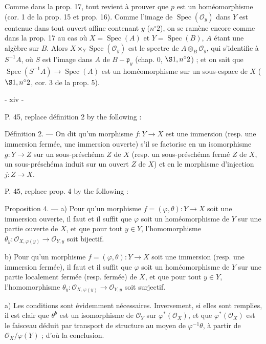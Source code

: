 Comme dans la prop. 17, tout revient à prouver que $p$ est un homéomorphisme (cor. 1 de la prop. 15 et prop. 16). Comme l'image de $\operatorname{Spec}(\mathcal{O}_y)$ dans $Y$ est contenue dans tout ouvert affine contenant $y$ ($n^\circ 2$), on se ramène encore comme dans la prop. 17 au cas où $X = \operatorname{Spec}(A)$ et $Y = \operatorname{Spec}(B)$, $A$ étant une algèbre sur $B$. Alors $X \times_Y \operatorname{Spec}(\mathcal{O}_y)$ est le spectre de $A \otimes_B \mathcal{O}_y$, qui s'identifie à $S^{-1}A$, où $S$ est l'image dans $A$ de $B - \mathfrak{p}_y$ (chap. 0, $\S 1, n^\circ 2$) ; et on sait que $\operatorname{Spec}(S^{-1}A) \to \operatorname{Spec}(A)$ est un homéomorphisme sur un sous-espace de $X$ ($\S 1, n^\circ 2$, cor. 3 de la prop. 5).

\newpage


- xiv -

P. 45, replace définition 2 by the following :

Définition 2. — On dit qu'un morphisme $f : Y \to X$ est une immersion (resp. une immersion fermée, une immersion ouverte) s'il se factorise en un isomorphisme $g : Y \to Z$ sur un sous-préschéma $Z$ de $X$ (resp. un sous-préschéma fermé $Z$ de $X$, un sous-préschéma induit sur un ouvert $Z$ de $X$) et en le morphisme d'injection $j : Z \to X$.

P. 45, replace prop. 4 by the following :

Proposition 4. — a) Pour qu'un morphisme $f = (\varphi, \theta) : Y \to X$ soit une immersion ouverte, il faut et il suffit que $\varphi$ soit un homéomorphisme de $Y$ sur une partie ouverte de $X$, et que pour tout $y \in Y$, l'homomorphisme $\theta_y : \mathcal{O}_{X, \varphi(y)} \to \mathcal{O}_{Y, y}$ soit bijectif.

b) Pour qu'un morphisme $f = (\varphi, \theta) : Y \to X$ soit une immersion (resp. une immersion fermée), il faut et il suffit que $\varphi$ soit un homéomorphisme de $Y$ sur une partie localement fermée (resp. fermée) de $X$, et que pour tout $y \in Y$, l'homomorphisme $\theta_y : \mathcal{O}_{X, \varphi(y)} \to \mathcal{O}_{Y, y}$ soit surjectif.

a) Les conditions sont évidemment nécessaires. Inversement, si elles sont remplies, il est clair que $\theta^b$ est un isomorphisme de $\mathcal{O}_Y$ sur $\varphi^*(\mathcal{O}_X)$, et que $\varphi^*(\mathcal{O}_X)$ est le faisceau déduit par transport de structure au moyen de $\varphi^{-1} \theta$, à partir de $\mathcal{O}_X / \varphi(Y)$ ; d'où la conclusion.

